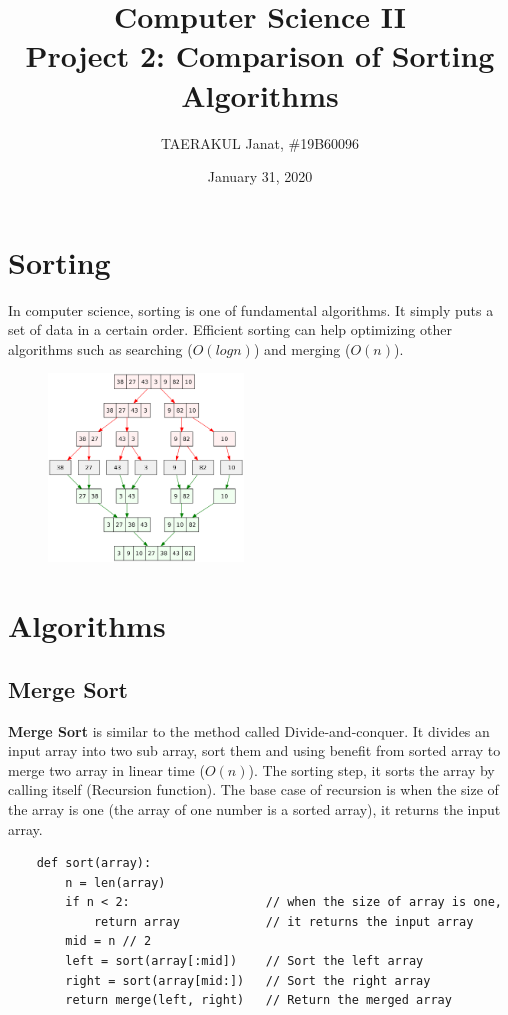 \documentclass[12pt]{article}
\title{Computer Science II \\Project 2: Comparison of Sorting Algorithms}
\author{TAERAKUL Janat, \#19B60096}
\date{January 31, 2020}
\begin{document}

\maketitle

\section{Sorting}\label{sec:instr}

	In computer science, sorting is one of fundamental algorithms. It simply puts a set of data in a certain order. Efficient sorting can help optimizing other algorithms such as searching ($O(logn)$) and merging ($O(n)$).
	
	\begin{figure}[ht]
		\centering
		\includegraphics[height=5cm]{Merge_sort_algorithm_diagram.png}
	\end{figure}


\section{Algorithms}\label{sec:how}
	
	\subsection{Merge Sort}
	
	\textbf{Merge Sort} is similar to the method called Divide-and-conquer. It divides an input array into two sub array, sort them and using benefit from sorted array to merge two array in linear time ($O(n)$). The sorting step, it sorts the array by calling itself (Recursion function). The base case of recursion is when the size of the array is one (the array of one number is a sorted array), it returns the input array.
	
	\begin{verbatim}
	def sort(array):
	    n = len(array)
	    if n < 2:                   // when the size of array is one,
	        return array            // it returns the input array
	    mid = n // 2
	    left = sort(array[:mid])    // Sort the left array
	    right = sort(array[mid:])   // Sort the right array
	    return merge(left, right)   // Return the merged array
	\end{verbatim}
	
\end{document}
